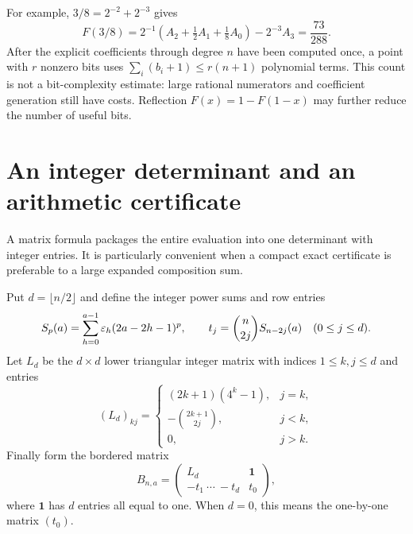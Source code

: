 \documentclass[11pt,oneside]{article}
\theoremstyle{definition}\newtheorem{definition}[theorem]{Definition}
\theoremstyle{remark}\newtheorem{remark}[theorem]{Remark}
\begin{document}
For example, $3/8=2^{-2}+2^{-3}$ gives
\[
 F(3/8)=2^{-1}\left(A_2+\tfrac12 A_1+\tfrac{1}{8}A_0\right)
        -2^{-3}A_3=\frac{73}{288}.
\]
After the explicit coefficients through degree $n$ have been computed once,
a point with $r$ nonzero bits uses $\sum_i(b_i+1)\le r(n+1)$ polynomial
terms. This count is not a bit-complexity estimate: large rational numerators
and coefficient generation still have costs. Reflection
$F(x)=1-F(1-x)$ may further reduce the number of useful bits.

\section{An integer determinant and an arithmetic certificate}
\label{sec:det}

A matrix formula packages the entire evaluation into one determinant with
integer entries. It is particularly convenient when a compact exact
certificate is preferable to a large expanded composition sum.

Put $d=\lfloor n/2\rfloor$ and define the integer power sums and row entries
\begin{equation}
 S_p(a)=\sum_{h=0}^{a-1}\varepsilon_h(2a-2h-1)^p,
 \qquad t_j=\binom n{2j}S_{n-2j}(a)\quad(0\le j\le d).
 \label{eq:detrow}
\end{equation}
Let $L_d$ be the $d\times d$ lower triangular integer matrix with indices
$1\le k,j\le d$ and entries
\begin{equation}
 (L_d)_{kj}=
 \begin{cases}
 (2k+1)(4^k-1),&j=k,\\
 -\binom{2k+1}{2j},&j<k,\\
 0,&j>k.
 \end{cases}
 \label{eq:momentmatrix}
\end{equation}
Finally form the bordered matrix
\begin{equation}
 B_{n,a}=\begin{pmatrix}
 L_d&\boldsymbol 1\\
 -t_1\ \cdots\ -t_d&t_0
 \end{pmatrix},
 \label{eq:bordered}
\end{equation}
where $\boldsymbol 1$ has $d$ entries all equal to one. When $d=0$, this
means the one-by-one matrix $(t_0)$.
\end{document}
